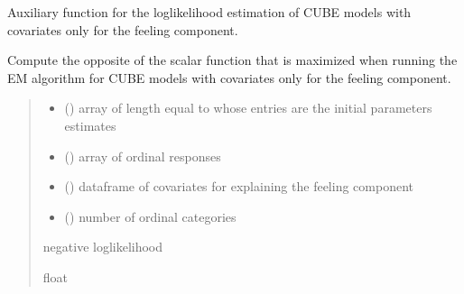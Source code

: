 \documentclass[letterpaper,10pt,english]{sphinxmanual}
\begin{document}
\begin{fulllineitems}
\label{\detokenize{cubmods:cubmods.cube_0w0.effe}}
\pysigstartsignatures
{}
\pysigstopsignatures
\sphinxAtStartPar
Auxiliary function for the log\sphinxhyphen{}likelihood estimation of CUBE models with covariates 
only for the feeling component.

\sphinxAtStartPar
Compute the opposite of the scalar function that is maximized when running the 
E\sphinxhyphen{}M algorithm for CUBE models with covariates only for the feeling component.
\begin{quote}\begin{description}
\begin{itemize}
\item {} 
\sphinxAtStartPar
{} () \textendash{} array of length equal to  whose entries are the initial parameters estimates

\item {} 
\sphinxAtStartPar
{} () \textendash{} array of ordinal responses

\item {} 
\sphinxAtStartPar
{} () \textendash{} dataframe of covariates for explaining the feeling component

\item {} 
\sphinxAtStartPar
{} () \textendash{} number of ordinal categories

\end{itemize}

\sphinxAtStartPar
negative log\sphinxhyphen{}likelihood

\sphinxAtStartPar
float

\end{description}\end{quote}

\end{fulllineitems}
\end{document}
